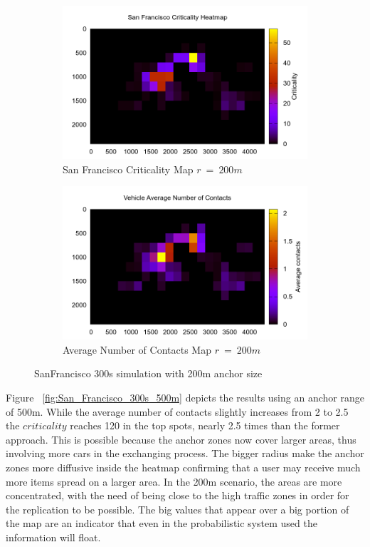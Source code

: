 \begin{figure}[t]
	\begin{subfigure}[t]{0.5\textwidth}
 		\includegraphics[width=\textwidth]{img/SanFrancisco/criticality3_sim_SanFrancisco6_300s_200m}
 		\caption{San Francisco Criticality Map $r\ =\ 200m$}
 		\label{fig:SanFrancisco_criticality_300s_200m}
 	\end{subfigure}%
 	\hfill
 	\begin{subfigure}[t]{0.5\textwidth}
 		\includegraphics[width=\textwidth]{img/SanFrancisco/avgContacts_sim_SanFrancisco6_300s_200m}
 		\caption{Average Number of Contacts Map $r\ =\ 200m$}
 		\label{fig:SanFrancisco_avg_300s_200m}
 	\end{subfigure}
 	\caption{SanFrancisco 300s simulation with 200m anchor size}
 	\label{fig:SanFrancisco_300s_200m}
\end{figure}

Figure ~\ref{fig:San_Francisco_300s_500m} depicts the results using an anchor
range of 500m. While the average number of contacts slightly increases from 2 to
2.5 the $criticality$ reaches 120 in the top spots, nearly 2.5 times than the
former approach. This is possible because the anchor zones now cover larger
areas, thus involving more cars in the exchanging process. The bigger
radius make the anchor zones more diffusive inside the heatmap confirming that a
user may receive much more items spread on a larger area. In the 200m scenario,
the areas are more concentrated, with the need of being close to the high
traffic zones in order for the replication to be possible. The big values that
appear over a big portion of the map are an indicator that even in the
probabilistic system used the information will float. 

